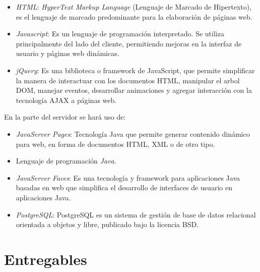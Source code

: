 \documentclass[11pt,letterpaper,titlepage]{article}
\begin{document}
\begin{itemize}
 \item \textit{HTML}: \textit{HyperText Markup Language} (Lenguaje de Marcado de Hipertexto), es el lenguaje de marcado predominante para la elaboraci\'on de p\'aginas web.
 \item \textit{Javascript}: Es un lenguaje de programaci\'on interpretado. Se utiliza principalmente del lado del cliente, permitiendo mejoras en la interfaz de usuario y p\'aginas web din\'amicas.
 \item \textit{jQuery}: Es una biblioteca o framework de JavaScript, que permite simplificar la manera de interactuar con los documentos HTML, manipular el arbol DOM, manejar eventos, desarrollar animaciones y agregar interacci\'on con la tecnolog\'ia AJAX a p\'aginas web.
\end{itemize}
En la parte del servidor se har\'a uso de:
\begin{itemize}
 \item \textit{JavaServer Pages}: Tecnolog\'ia Java que permite generar contenido din\'amico para web, en forma de documentos HTML, XML o de otro tipo.\cite{jsp}

 \item Lenguaje de programaci\'on \textit{Java}.
\item \textit{JavaServer Faces}: Es una tecnolog\'ia y framework para aplicaciones Java basadas en web que simplifica el desarrollo de interfaces de usuario en aplicaciones Java.\cite{jsf}
 \item \textit{PostgreSQL}: PostgreSQL es un sistema de gesti\'on de base de datos relacional orientada a objetos y libre, publicado bajo la licencia BSD.\cite{postgre}
\end{itemize}


\section{Entregables}
\end{document}
